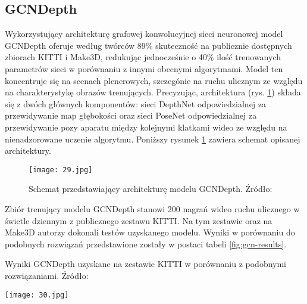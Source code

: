\subsection{GCNDepth}
Wykorzystujący architekturę grafowej konwolucyjnej sieci neuronowej \cite{GNNBook2022} model GCNDepth \cite{masoumian2021gcndepth} oferuje według twórców 89\% skuteczność na publicznie dostępnych zbiorach KITTI i Make3D, redukując jednocześnie o 40\% ilość trenowanych parametrów sieci w porównaniu z innymi obecnymi algorytmami. Model ten koncentruje się na scenach plenerowych, szczegónie na ruchu ulicznym ze względu na charakterystykę obrazów trenujących. Precyzując, architektura (rys. \ref{fig:gcn-schema}) składa się z dwóch głównych komponentów: sieci DepthNet odpowiedzialnej za przewidywanie map głębokości oraz sieci PoseNet odpowiedzialnej za przewidywanie pozy aparatu między kolejnymi klatkami wideo ze względu na nienadzorowane uczenie algorytmu. Poniższy rysunek \ref{fig:gcn-schema} zawiera schemat opisanej architektury.
\begin{figure}[H]
    \centering
    \texttt{[image: 29.jpg]}
    \caption{Schemat przedstawiający architekturę modelu GCNDepth. Źródło: \cite{GNNBook2022}}
    \label{fig:gcn-schema}
\end{figure}
Zbiór trenujący modelu GCNDepth stanowi 200 nagrań wideo ruchu ulicznego w świetle dziennym z publicznego zestawu KITTI. Na tym zestawie oraz na Make3D autorzy dokonali testów uzyskanego modelu. Wyniki w porównaniu do podobnych rozwiązań przedstawione zostały w postaci tabeli \ref{fig:gcn-results}.
\begin{table}[H]
    \centering
    \caption{Wyniki GCNDepth uzyskane na zestawie KITTI w porównaniu z podobnymi rozwiązaniami. Źródło: \cite{GNNBook2022}}
    \texttt{[image: 30.jpg]}
    \label{fig:gcn-results}
\end{table}


